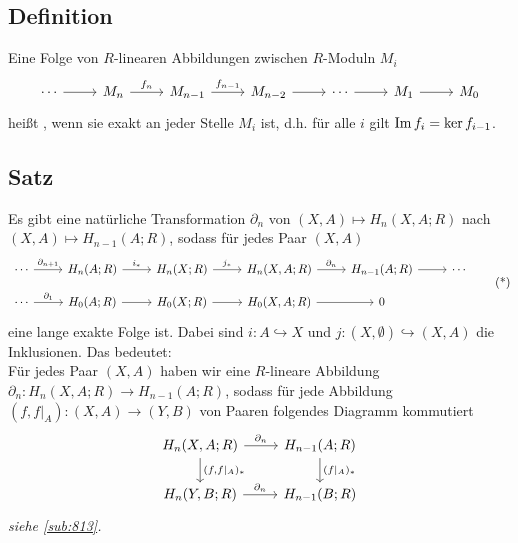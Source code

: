 \subsection[Definition: Lange exakte Sequenz von $R$-Moduln]{Definition} %
\label{sub:87}
Eine Folge von $R$-linearen Abbildungen zwischen $R$-Moduln $M_i$
\[
	\begin{tikzcd}
		\cdots \rar & M_n \rar["f_n"]  & M_{n-1} \rar["f_{n-1}"] & M_{n-2} \rar & \cdots \rar & M_1 \rar & M_0
	\end{tikzcd}
\]
heißt , wenn sie exakt an jeder Stelle $M_i$ ist, d.h. für alle $i$ gilt $\operatorname{Im} f_i = \ker f_{i-1}$.

\subsection[Satz: Existenz der Paarsequenz]{Satz} %
\label{sub:88}
Es gibt eine natürliche Transformation $\partial_n$ von $(X,A) \mapsto H_n(X,A;R)$ nach $(X,A) \mapsto H_{n-1}(A;R)$, sodass für jedes Paar $(X,A)$
\begin{equation*}
	\begin{tikzcd}[row sep=1em, column sep=2.4em]
		\cdots  \rar["\partial_{n+1}"] & H_n(A;R) \rar["i_*"] & H_n(X;R) \rar["j_*"] & H_n(X,A;R) \rar["\partial_n"] 
		& H_{n-1}(A;R) \rar & \cdots \\
		\cdots \rar["\partial_1"] & H_0(A;R) \rar & H_0(X;R) \rar & H_0(X,A;R) \rar & 0
	\end{tikzcd} \label{eq:88}\tag{*}
\end{equation*}
eine lange exakte Folge ist. Dabei sind $i \colon A \hookrightarrow X$ und $j \colon (X,\emptyset) \hookrightarrow (X,A)$ die Inklusionen. Das bedeutet: \smallskip\\
Für jedes Paar $(X,A)$ haben wir eine $R$-lineare Abbildung $\partial_n \colon H_n(X,A;R) \to H_{n-1}(A;R)$, sodass für jede Abbildung $(f,f|_{A}) \colon (X,A) \to (Y,B)$ von Paaren
folgendes Diagramm kommutiert
\[
	\begin{tikzcd}
		H_{n}(X,A;R) \rar["\partial_n"] \dar["{(f,f|_A)_*}"] & H_{n-1}(A;R) \dar["{(f|_A)_*}"] \\
		H_n(Y,B;R) \rar["\partial_n"] & H_{n-1}(B;R)
	\end{tikzcd}
\]
\emph{siehe \ref{sub:813}.}

